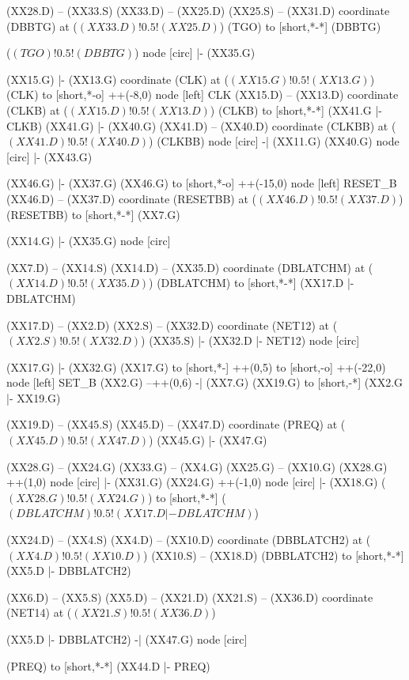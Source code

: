 \begin{circuitikz}[american]
	(XX28.D) -- (XX33.S)
	(XX33.D) -- (XX25.D)
	(XX25.S) -- (XX31.D)
 	coordinate (DBBTG) at ($(XX33.D)!0.5!(XX25.D)$)
 	(TGO) to [short,*-*] (DBBTG)
 	
 	($(TGO)!0.5!(DBBTG)$) node [circ] {} |- (XX35.G)
 
	
	(XX15.G) |- (XX13.G)
	coordinate (CLK) at ($(XX15.G)!0.5!(XX13.G)$)
	(CLK) to [short,*-o] ++(-8,0) node [left] {CLK}
	(XX15.D) -- (XX13.D)
	coordinate (CLKB) at ($(XX15.D)!0.5!(XX13.D)$)
	(CLKB) to [short,*-*] (XX41.G |- CLKB)
	(XX41.G) |- (XX40.G) 	
 	(XX41.D) -- (XX40.D)
	coordinate (CLKBB) at ($(XX41.D)!0.5!(XX40.D)$)
	(CLKBB) node [circ] {} -| (XX11.G) 
	(XX40.G) node [circ] {} |- (XX43.G)

	(XX46.G) |- (XX37.G)
	(XX46.G) to [short,*-o] ++(-15,0) node [left] {RESET\_B}
	(XX46.D) -- (XX37.D)
	coordinate (RESETBB) at ($(XX46.D)!0.5!(XX37.D)$)
	(RESETBB) to [short,*-*] (XX7.G)
	
	(XX14.G) |- (XX35.G) node [circ] {}
	
	(XX7.D) -- (XX14.S)
	(XX14.D) -- (XX35.D)
	coordinate (DBLATCHM) at ($(XX14.D)!0.5!(XX35.D)$)
	(DBLATCHM) to [short,*-*] (XX17.D |- DBLATCHM)
	
	(XX17.D) -- (XX2.D) 
	(XX2.S) -- (XX32.D)
	coordinate (NET12) at ($(XX2.S)!0.5!(XX32.D)$)
	(XX35.S) |- (XX32.D |- NET12) node [circ] {}
	
	(XX17.G) |- (XX32.G)
	(XX17.G) to [short,*-] ++(0,5) to [short,-o] ++(-22,0) node [left] {SET\_B}
	(XX2.G) --++(0,6) -| (XX7.G)
	(XX19.G) to [short,-*] (XX2.G |- XX19.G)
	
	(XX19.D) -- (XX45.S)
	(XX45.D) -- (XX47.D)
	coordinate (PREQ) at ($(XX45.D)!0.5!(XX47.D)$)	
	(XX45.G) |- (XX47.G) 
	

	(XX28.G) -- (XX24.G)
	(XX33.G) -- (XX4.G)
	(XX25.G) -- (XX10.G)
	(XX28.G) ++(1,0) node [circ] {} |- (XX31.G) 
	(XX24.G) ++(-1,0) node [circ] {} |- (XX18.G) 
	($(XX28.G)!0.5!(XX24.G)$) to [short,*-*] ($(DBLATCHM)!0.5!(XX17.D |- DBLATCHM)$)

	(XX24.D) -- (XX4.S)
	(XX4.D) -- (XX10.D)
	coordinate (DBBLATCH2) at ($(XX4.D)!0.5!(XX10.D)$)
	(XX10.S) -- (XX18.D)
	(DBBLATCH2) to [short,*-*] (XX5.D |- DBBLATCH2)
	
	(XX6.D) -- (XX5.S)
	(XX5.D) -- (XX21.D)
	(XX21.S) -- (XX36.D)
	coordinate (NET14) at ($(XX21.S)!0.5!(XX36.D)$)
	
	(XX5.D |- DBBLATCH2) -| (XX47.G) node [circ] {}
	
	(PREQ) to [short,*-*] (XX44.D |- PREQ)
	

\end{circuitikz}
